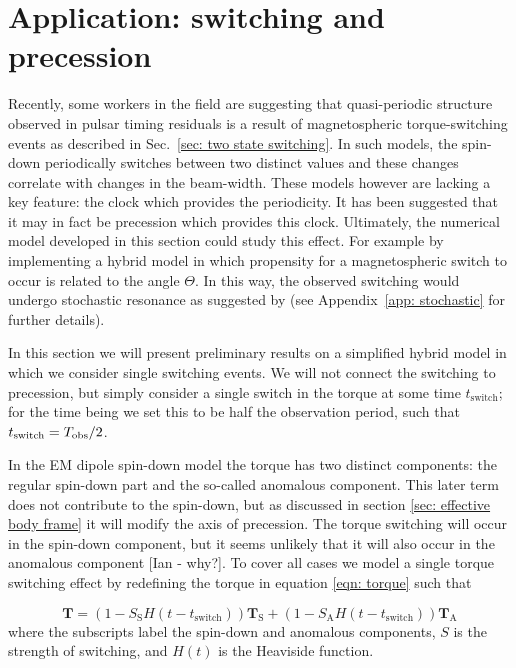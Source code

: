 \documentclass[../full_thesis/full_thesis.tex]{subfiles}
\begin{document}
\section{Application: switching and precession}

Recently, some workers in the field \citep{Lyne2010, Perera2015} are suggesting
that quasi-periodic structure observed in pulsar timing residuals is a result
of magnetospheric torque-switching events as described in Sec.~\ref{sec: two
state switching}. In such models, the spin-down periodically switches between
two distinct values and these changes correlate with changes in the beam-width.
These models however are lacking a key feature: the clock which provides the
periodicity. It has been suggested \citep{Jones2012} that it may in fact be
precession which provides this clock. Ultimately, the numerical model developed
in this section could study this effect. For example by implementing a hybrid
model in which propensity for a magnetospheric switch to occur is related to
the angle $\Theta$. In this way, the observed switching would undergo
stochastic resonance as suggested by \citet{Cordes2013} (see Appendix~\ref{app:
stochastic} for further details).

In this section we will present preliminary results on a simplified hybrid model
in which we consider single switching events. We will not connect the switching
to precession, but simply consider a single switch in the torque at some time
$t_{\mathrm{switch}}$; for the time being we set this to be half the
observation period, such that $t_{\mathrm{switch}} = T_{\textrm{obs}}/2$.

In the EM dipole spin-down model the torque has two distinct components: the
regular spin-down part and the so-called anomalous component. This later term 
does not contribute to the spin-down, but as discussed in section \ref{sec: effective
body frame} it will modify the axis of precession. The torque switching will 
occur in the spin-down component, but it seems unlikely that it will also
occur in the anomalous component [Ian - why?]. To cover all cases we 
model a single torque switching effect by redefining the torque in equation
\eqref{eqn: torque} such that

\newcommand{\Ss}{S_{\mathrm{S}}}
\newcommand{\Sa}{S_{\mathrm{A}}}

\begin{equation}
\mathbf{T} = (1 - \Ss H(t-t_{\mathrm{switch}})) \mathbf{T}_{\mathrm{S}}+
                 (1 - \Sa H(t-t_{\mathrm{switch}})) \mathbf{T}_{\mathrm{A}}
\label{eqn: single switch torque}
\end{equation} 
where the subscripts label the spin-down and anomalous components, $S$ is the
strength of switching, and $H(t)$ is the Heaviside function. 
\end{document}
